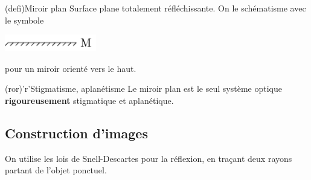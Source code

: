 \documentclass[../../main/main.tex]{subfiles}
\begin{document}
\begin{tcbraster}[raster columns=2, raster equal height=rows]
	\begin{tcb}[label=def:mir](defi){Miroir plan}
		Surface plane totalement réfléchissante. On le schématisme avec le symbole
		\begin{center}
			\includegraphics[width=4cm]{mir_plan}
		\end{center}
		pour un miroir orienté vers le haut.
	\end{tcb}
	\begin{tcb}[label=mirstig](ror)'r'{Stigmatisme, aplanétisme}
		Le miroir plan est le seul système optique \textbf{rigoureusement} stigmatique et
		aplanétique.
	\end{tcb}
\end{tcbraster}

\subsection{Construction d'images}
On utilise les lois de Snell-Descartes pour la réflexion, en traçant deux rayons
partant de l'objet ponctuel.
\end{document}
